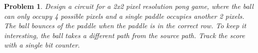 \documentclass{article}
\newtheorem{prob}{Problem}
\begin{document}
\begin{prob}
  Design a circuit for a 2x2 pixel resolution pong game, where the ball can only
  occupy 4 possible pixels and a single paddle occupies another 2 pixels. The
  ball bounces of the paddle when the paddle is in the correct row. To keep it
  interesting, the ball takes a different path from the source path. Track the
  score with a single bit counter.
\end{prob}



\end{document}
